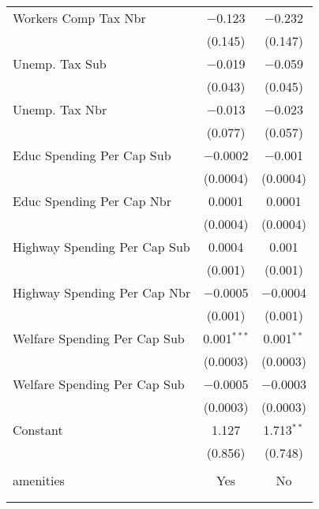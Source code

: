 \begin{table}[!htbp]
\begin{tabular}{@{\extracolsep{5pt}}lcc}
  Workers Comp Tax Nbr & $-$0.123 & $-$0.232 \\ 
  & (0.145) & (0.147) \\ 
  Unemp. Tax Sub & $-$0.019 & $-$0.059 \\ 
  & (0.043) & (0.045) \\ 
  Unemp. Tax Nbr & $-$0.013 & $-$0.023 \\ 
  & (0.077) & (0.057) \\ 
  Educ Spending Per Cap Sub & $-$0.0002 & $-$0.001 \\ 
  & (0.0004) & (0.0004) \\ 
  Educ Spending Per Cap Nbr & 0.0001 & 0.0001 \\ 
  & (0.0004) & (0.0004) \\ 
  Highway Spending Per Cap Sub & 0.0004 & 0.001 \\ 
  & (0.001) & (0.001) \\ 
  Highway Spending Per Cap Nbr & $-$0.0005 & $-$0.0004 \\ 
  & (0.001) & (0.001) \\ 
  Welfare Spending Per Cap Sub & 0.001$^{***}$ & 0.001$^{**}$ \\ 
  & (0.0003) & (0.0003) \\ 
  Welfare Spending Per Cap Sub & $-$0.0005 & $-$0.0003 \\ 
  & (0.0003) & (0.0003) \\ 
  Constant & 1.127 & 1.713$^{**}$ \\ 
  & (0.856) & (0.748) \\ 
 \hline \\[-1.8ex] 
amenities & Yes & No \\ 
\hline \\[-1.8ex] 
\hline 
\hline \\[-1.8ex] 
\end{tabular} 
\end{table} 
